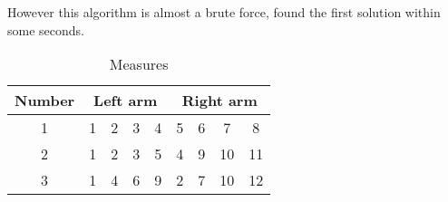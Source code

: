 \documentclass[11pt]{article} %
\begin{document}
However this algorithm is almost a brute force, found the first solution within some seconds.

\begin{table}[h]
\begin{center}
\begin{tabular}{c|cccc|cccc}
  \toprule
  Number & \multicolumn{4}{c|}{Left arm} & \multicolumn{4}{c}{Right arm} \\
  \midrule
       1 & 1 & 2 & 3 & 4 & 5 & 6 & 7 & 8 \\
       2 & 1 & 2 & 3 & 5 & 4 & 9 & 10 & 11 \\
       3 & 1 & 4 & 6 & 9 & 2 & 7 & 10 & 12 \\
  \bottomrule
\end{tabular}
\end{center}
\caption{Measures}
\end{table}

\newlength{\leveldistance}\newlength{\longBdistance}\newlength{\longCdistance}
\newlength{\discthick}
\pgfmathsetlength{\leveldistance}{1.6cm}
\pgfmathsetlength{\discthick}{0.8cm}
\end{document}
